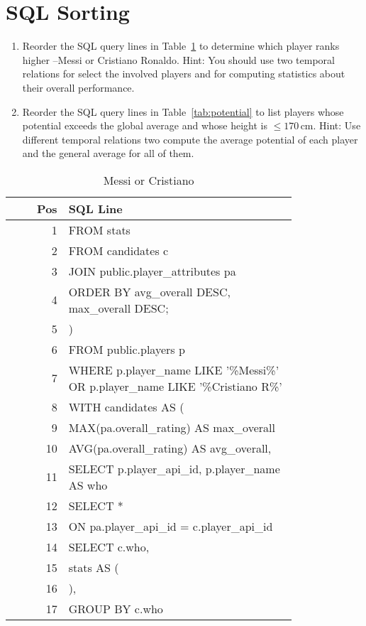 \documentclass{article}
\begin{document}
\section{SQL Sorting}

\begin{enumerate}
  \item Reorder the SQL query lines in Table~\ref{tab:messi-cristiano} to determine which player ranks higher --Messi or Cristiano Ronaldo.  Hint: You should use two temporal relations for select the involved players and for computing statistics about their overall performance.

  \item Reorder the SQL query lines in Table~\ref{tab:potential} to list players whose potential exceeds the global average and whose height is $\leq 170\,\mathrm{cm}$.  Hint: Use different temporal relations two compute the average potential of each player and the general average for all of them.
\end{enumerate}


\begin{table}[t]
  \centering
  \caption{Messi or Cristiano}
  \label{tab:messi-cristiano}
  \begin{tabular}{ r p{0.8\linewidth}}
    \toprule
    \textbf{Pos}
    & \textbf{SQL Line} \\
    \midrule
    1
    & FROM stats \\
    2
    &   FROM candidates c \\
    3
    &   JOIN public.player\_attributes pa \\
    4
    & ORDER BY avg\_overall DESC, max\_overall DESC; \\
    5
    & ) \\
    6
    &   FROM public.players p \\
    7
    &   WHERE p.player\_name LIKE '\%Messi\%' OR p.player\_name LIKE '\%Cristiano R\%' \\
    8
    & WITH candidates AS ( \\
    9
    &          MAX(pa.overall\_rating) AS max\_overall \\
    10
    &          AVG(pa.overall\_rating) AS avg\_overall, \\
    11
    &   SELECT p.player\_api\_id, p.player\_name AS who \\
    12
    & SELECT *  \\
    13
    &   ON pa.player\_api\_id = c.player\_api\_id \\
    14
    &   SELECT c.who, \\
    15
    & stats AS ( \\
    16
    & ), \\
    17
    &   GROUP BY c.who \\
    \bottomrule
  \end{tabular}
\end{table}
\end{document}
